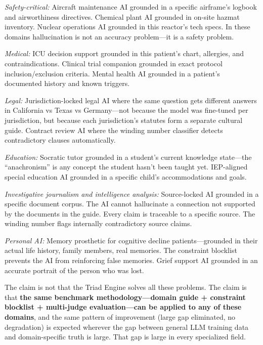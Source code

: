 \documentclass[11pt,a4paper]{article}
\begin{document}
\textit{Safety-critical:} Aircraft maintenance AI grounded in a specific
airframe's logbook and airworthiness directives. Chemical plant AI grounded
in on-site hazmat inventory. Nuclear operations AI grounded in this reactor's
tech specs. In these domains hallucination is not an accuracy problem---it is
a safety problem.

\textit{Medical:} ICU decision support grounded in this patient's chart,
allergies, and contraindications. Clinical trial companion grounded in exact
protocol inclusion/exclusion criteria. Mental health AI grounded in a
patient's documented history and known triggers.

\textit{Legal:} Jurisdiction-locked legal AI where the same question gets
different answers in California vs Texas vs Germany---not because the model
was fine-tuned per jurisdiction, but because each jurisdiction's statutes
form a separate cultural guide. Contract review AI where the winding number
classifier detects contradictory clauses automatically.

\textit{Education:} Socratic tutor grounded in a student's current knowledge
state---the ``anachronism'' is any concept the student hasn't been taught
yet. IEP-aligned special education AI grounded in a specific child's
accommodations and goals.

\textit{Investigative journalism and intelligence analysis:} Source-locked AI
grounded in a specific document corpus. The AI cannot hallucinate a
connection not supported by the documents in the guide. Every claim is
traceable to a specific source. The winding number flags internally
contradictory source claims.

\textit{Personal AI:} Memory prosthetic for cognitive decline
patients---grounded in their actual life history, family members, real
memories. The constraint blocklist prevents the AI from reinforcing false
memories. Grief support AI grounded in an accurate portrait of the person who
was lost.

The claim is not that the Triad Engine solves all these problems. The claim
is that \textbf{the same benchmark methodology---domain guide + constraint
blocklist + multi-judge evaluation---can be applied to any of these domains},
and the same pattern of improvement (large gap eliminated, no degradation) is
expected wherever the gap between general LLM training data and
domain-specific truth is large. That gap is large in every specialized field.

\end{document}
